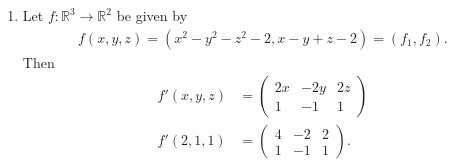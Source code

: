 \documentclass[11pt]{amsart}
\theoremstyle{plain}
\numberwithin{equation}{section}
\begin{document}
\begin{enumerate}[label=\textbf{(\alph*)}]
\begin{align*}
{\begin{pmatrix}
    \end{pmatrix}\right\Vert}{ \sqrt{h_1^2+h_2^2+h_3^2}}
    \\
\end{align*}
which simplifies to
\begin{align*}
&=\lim_{\left(h_{1},h_{2},h_{3}\right)\to(0,0,0)}\frac{\left\Vert \begin{pmatrix}
        h_{1}^{2}+h_{2}^{2}+h_{3}^{2} \\ h_{1}h_{2}+h_{2}h_{3}
    \end{pmatrix}\right\Vert}{\sqrt{h_{1}^{2}+h_{2}^{2}+h_{3}^{2}}}
    \\
    &\leq\lim_{\left(h_{1},h_{2},h_{3}\right)\to(0,0,0)}\frac{\left|h_{1}^{2}+h_{2}^{2}+h_{3}^{2}\right|+\left|h_{2}\right|\left|h_{1}+h_{3}\right|}{\sqrt{h_{1}^{2}+h_{2}^{2}+h_{3}^{2}}}
    \\
    &\leq\lim_{\left(h_{1},h_{2},h_{3}\right)\to(0,0,0)}\frac{\left|h_{1}^{2}+h_{2}^{2}+h_{3}^{2}\right|+\left|h_{2}\right|\left|h_{1}\right|+\left|h_{2}\right|\left|h_{3}\right|}{\sqrt{h_{1}^{2}+h_{2}^{2}+h_{3}^{2}}}
    \\
    &\leq\lim_{\left(h_{1},h_{2},h_{3}\right)\to(0,0,0)}\sqrt{h_{1}^{2}+h_{2}^{2}+h_{3}^{2}}+\left|h_{1}\right|+\left|h_{3}\right|
\end{align*}
which is bounded above 0. Hence, $F$ is differentiable at $(1,0,2)$. The Jacobian matrix is given by
\begin{align*}
    F'(1,0,2)=\begin{pmatrix}
        2 & 0 & 4
        \\
        0 & 3 & 0
    \end{pmatrix}.
\end{align*}
\item Let $f:\mathbb{R}^{3}\longrightarrow\mathbb{R}^{2}$ be given by 
\begin{align*}
    f(x,y,z)=\left(x^{2}-y^{2}-z^{2}-2,x-y+z-2\right)=\left(f_{1},f_{2}\right).
\end{align*}
Then
\begin{align*}
    f'(x,y,z)&=\begin{pmatrix}
        2x & -2y & 2z \\ 1 & -1 & 1
    \end{pmatrix}
    \\
    f'(2,1,1)&=\begin{pmatrix}
        4 & -2 & 2 \\ 1 & -1 & 1
    \end{pmatrix}.
\end{align*}

\end{enumerate}
\end{document}
